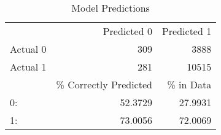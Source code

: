 \documentclass[12pt]{article}
\begin{document}
		\begin{table}[h]
		\centering
		\caption{Model Predictions}
		\begin{tabular}{@{}lll@{}}
			\cmidrule{2-3}
			& \multicolumn{1}{r}{Predicted 0}  & \multicolumn{1}{r}{Predicted 1} \\
			\cmidrule{1-3}
			\multicolumn{1}{l}{Actual 0 }  & \multicolumn{1}{r}{309}   & \multicolumn{1}{r}{3888}   \\
			\multicolumn{1}{l}{Actual 1}                               & \multicolumn{1}{r}{281}         & \multicolumn{1}{r}{10515}  \\
			\bottomrule
			\toprule
			& \multicolumn{1}{r}{\% Correctly Predicted}         & \multicolumn{1}{r}{\% in Data}        \\
			\cmidrule{2-3}
			\multicolumn{1}{l}{0:}                                     & \multicolumn{1}{r}{52.3729}      & \multicolumn{1}{r}{27.9931} \\
			\multicolumn{1}{l}{1:}                                & \multicolumn{1}{r}{73.0056}      & \multicolumn{1}{r}{72.0069} \\ \bottomrule
		\end{tabular}
		\label{table:6}
	\end{table}
\end{document}
